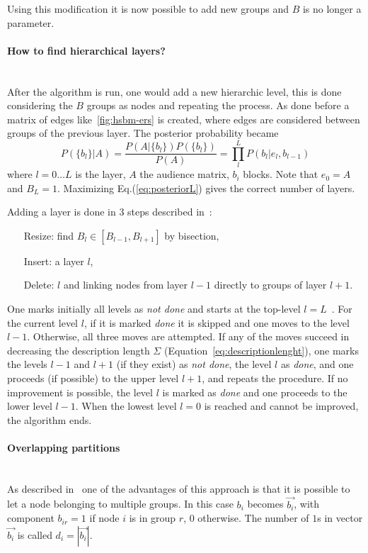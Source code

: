 Using this modification it is now possible to add new groups and $B$ is no longer a parameter.

\paragraph{How to find hierarchical layers?}\mbox{}\\
After the algorithm is run, one would add a new hierarchic level, this is done considering the $B$ groups as nodes and repeating the process.
As done before a matrix of edges like~\ref{fig:hsbm-ers} is created, where edges are considered between groups of the previous layer.
The posterior probability became
\begin{equation}\label{eq:posteriorL}
  P(\{b_l\}|A)=\frac{P(A|\{b_l\})P(\{b_l\})}{P(A)}=\prod_l^L P(b_l|e_l,b_{l-1})
\end{equation}
where $l=0\dots L$ is the layer, $A$ the audience matrix, $b_i$ blocks. Note that $e_0=A$ and $B_L=1$.
Maximizing Eq.(\ref{eq:posteriorL}) gives the correct number of layers.

Adding a layer is done in 3 steps described in~\cite{peixoto2014hierarchic}:
\begin{itemize}
  \item[Resize:] find $B_l\in[B_{l-1},B_{l+1}]$ by bisection,
  \item[Insert:] a layer $l$,
  \item[Delete:] $l$ and linking nodes from layer $l-1$ directly to groups of layer
  $l+1$.
\end{itemize}
One marks initially all levels as \textit{not done} and starts at the top-level $l = L$~\cite{peixoto2014hierarchic}.
For the current level $l$, if it is marked \textit{done} it is skipped and one moves to the level $l-1$. Otherwise, all three moves are attempted. If any of the moves succeed in decreasing the description length $\Sigma$ (Equation~\ref{eq:descriptionlenght}), one marks the levels $l-1$ and $l+1$ (if they exist) as \textit{not done}, the level $l$ as \textit{done}, and one proceeds (if possible) to the upper level $l+1$, and repeats the procedure. If no improvement is possible, the level $l$ is marked as \textit{done} and one proceeds to the lower level $l-1$. When the lowest level $l=0$ is reached and cannot be improved, the algorithm ends.

\paragraph{Overlapping partitions}\mbox{}\\
As described in~\cite{peixoto2015model} one of the advantages of this approach is that it is possible to let a node belonging to multiple groups.
In this case $b_i$ becomes $\vec{b_i}$, with component $b_{ir}=1$ if node $i$ is in group $r$, $0$ otherwise. The number of $1$s in vector $\vec{b_i}$ is called
$d_i=|\vec{b_i}|$.


